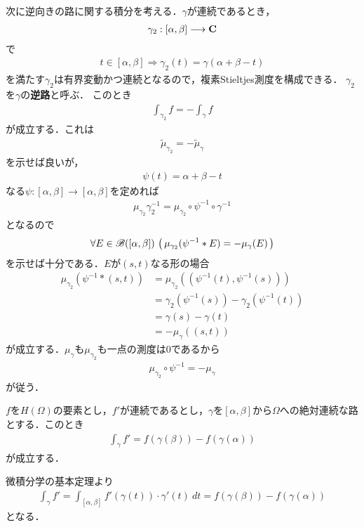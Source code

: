 	次に逆向きの路に関する積分を考える．$\gamma$が連続であるとき，
	\begin{align}
		\gamma_2 : [\alpha,\beta] \longrightarrow \mathbf{C}
	\end{align}
	で
	\begin{align}
		t \in [\alpha, \beta] \Longrightarrow \gamma_2(t) = \gamma(\alpha + \beta - t) 
	\end{align}
	を満たす$\gamma_2$は有界変動かつ連続となるので，複素Stieltjes測度を構成できる．
	$\gamma_2$を$\gamma$の{\bf 逆路}と呼ぶ．
	このとき
	\begin{align}
		\int_{\gamma_2} f = - \int_\gamma f
	\end{align}
	が成立する．これは
	\begin{align}
		\tilde{\mu}_{\gamma_2} = - \tilde{\mu}_\gamma 
	\end{align}
	を示せば良いが，
	\begin{align}
		\psi(t) = \alpha + \beta - t
	\end{align}
	なる$\psi:[\alpha,\beta] \longrightarrow [\alpha,\beta]$を定めれば
	\begin{align}
		\mu_{\gamma_2} \gamma_2^{-1} = \mu_{\gamma_2} \circ \psi^{-1} \circ \gamma^{-1}
	\end{align}
	となるので
	\begin{align}
		\forall E \in \mathscr{B}([\alpha,\beta])\,
		\left(\, \mu_{\gamma_2}(\psi^{-1} \ast E) = -\mu_\gamma(E)\, \right)
	\end{align}
	を示せば十分である．$E$が$(s,t)$なる形の場合
	\begin{align}
		\mu_{\gamma_2}\left(\psi^{-1} \ast (s,t)\right)
		&= \mu_{\gamma_2}\left( \left( \psi^{-1}(t),\psi^{-1}(s) \right) \right) \\
		&= \gamma_2\left(\psi^{-1}(s)\right) - \gamma_2\left(\psi^{-1}(t)\right) \\
		&= \gamma(s) - \gamma(t) \\
		&= -\mu_\gamma((s,t))
	\end{align}
	が成立する．$\mu_\gamma$も$\mu_{\gamma_2}$も一点の測度は$0$であるから
	\begin{align}
		\mu_{\gamma_2} \circ \psi^{-1} = -\mu_\gamma
	\end{align}
	が従う．
	
	\begin{screen}
		\begin{thm}[正則関数に対する微積分学の基本定理]
			$f$を$H(\Omega)$の要素とし，$f'$が連続であるとし，$\gamma$を$[\alpha,\beta]$から$\Omega$への絶対連続な路とする．このとき
			\begin{align}
				\int_{\gamma} f' = f(\gamma(\beta)) - f(\gamma(\alpha))
			\end{align}
			が成立する．
		\end{thm}
	\end{screen}
	
	\begin{prf}
		微積分学の基本定理より
		\begin{align}
			\int_{\gamma} f'
			= \int_{[\alpha,\beta]} f'(\gamma(t)) \cdot \gamma'(t)\ dt
			= f(\gamma(\beta)) - f(\gamma(\alpha))
		\end{align}
		となる．
		\QED
	\end{prf}